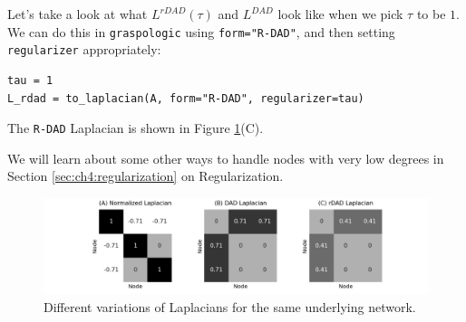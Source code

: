 Let's take a look at what $L^{rDAD}(\tau)$ and $L^{DAD}$ look like when we pick $\tau$ to be $1$. We can do this in \texttt{graspologic} using \texttt{form="R-DAD"}, and then setting \texttt{regularizer} appropriately:
\begin{lstlisting}[style=python]
tau = 1
L_rdad = to_laplacian(A, form="R-DAD", regularizer=tau)
\end{lstlisting}
The \texttt{R-DAD} Laplacian is shown in Figure \ref{fig:ch4:normlapl}(C).

We will learn about some other ways to handle nodes with very low degrees in Section \ref{sec:ch4:regularization} on Regularization.

\begin{figure}[h]
    \centering
    \includegraphics[width=\linewidth]{representations/ch4/Images/normlapls.png}
    \caption[comparison of normalized Laplacians]{Different variations of Laplacians for the same underlying network.}
    \label{fig:ch4:normlapl}
\end{figure}

\newpage